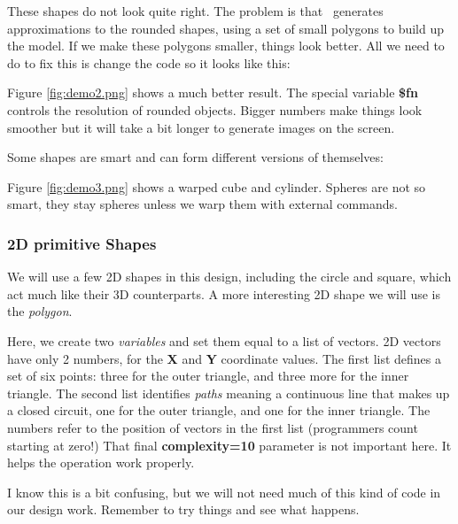 These shapes do not look quite right. The problem is that \osc\  generates
approximations to the rounded shapes, using a set of small polygons to build up
the model. If we make these polygons smaller, things look better. All we need
to do to fix this is change the code so it looks like this:


Figure \ref{fig:demo2.png} shows a much better result. The special variable
{\bf \$fn} controls the resolution of rounded objects. Bigger numbers make
things look smoother but it will take a bit longer to generate images on the screen.


Some shapes are smart and can form different versions of themselves:


Figure \ref{fig:demo3.png} shows a warped cube and cylinder. Spheres are not so
smart, they stay spheres unless we warp them with external commands.



\subsubsection{2D primitive Shapes}

We will use a few 2D shapes in this design, including the circle and square,
which act much like their 3D counterparts. A more interesting 2D shape we will
use is the {\it polygon}.


Here, we create two {\it variables} and set them equal to a list of vectors. 2D
vectors have only 2 numbers, for the {\bf X} and {\bf Y} coordinate values. The
first list defines a set of six points: three for the outer triangle, and three
more for the inner triangle. The second list identifies {\it paths} meaning a
continuous line that makes up a closed circuit, one for the outer triangle, and
one for the inner triangle. The numbers refer to the position of vectors in the
first list (programmers count starting at zero!) That final {\bf complexity=10}
parameter is not important here. It helps the operation work properly.

I know this is a bit confusing, but we will not need much of this kind of code
in our design work. Remember to try things and see what happens.


